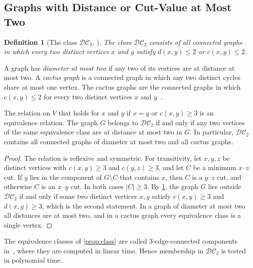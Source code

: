 \documentclass[pdflatex,sn-mathphys-num]{sn-jnl}%
\theoremstyle{thmstyleone}%
\theoremstyle{thmstyletwo}%
\theoremstyle{thmstylethree}%
\newtheorem{definition}{Definition}%
\newcommand{\DC}{\mathcal{DC}_2}%
\begin{document}
\subsection{Graphs with Distance or Cut-Value at Most Two}
\label{sec:class}

\begin{definition}[The class $\DC$, {\cite[Definition~37]{Michel2025MinCutPath}}]
\label{def:class}
The class $\DC$ consists of all connected graphs in which every two distinct vertices $x$ and $y$ satisfy $d(x, y) \leq 2$ or $c(x, y) \leq 2$.
\end{definition}

A graph has \emph{diameter at most two} if any two of its vertices are at distance at most two.
A \emph{cactus graph} is a connected graph in which any two distinct cycles share at most one vertex.
The cactus graphs are the connected graphs in which $c(x, y) \leq 2$ for every two distinct vertices $x$ and $y$~\cite[Lemma~6.1]{Michel2026MinCutPath}.

\begin{proposition}
\label{prop:class}
The relation on $V$ that holds for $x$ and $y$ if $x = y$ or $c(x, y) \geq 3$ is an equivalence relation.
The graph $G$ belongs to $\DC$ if and only if any two vertices of the same equivalence class are at distance at most two in $G$.
In particular, $\DC$ contains all connected graphs of diameter at most two and all cactus graphs.
\end{proposition}

\begin{proof}
The relation is reflexive and symmetric.
For transitivity, let $x, y, z$ be distinct vertices with $c(x, y) \geq 3$ and $c(y, z) \geq 3$, and let $C$ be a minimum $x$--$z$ cut.
If $y$ lies in the component of $G \setminus C$ that contains $x$, then $C$ is a $y$--$z$ cut, and otherwise $C$ is an $x$--$y$ cut.
In both cases $|C| \geq 3$.
By \cref{def:class}, the graph $G$ lies outside $\DC$ if and only if some two distinct vertices $x, y$ satisfy $c(x, y) \geq 3$ and $d(x, y) \geq 3$, which is the second statement.
In a graph of diameter at most two all distances are at most two, and in a cactus graph every equivalence class is a single vertex.
\end{proof}

The equivalence classes of \cref{prop:class} are called 3-edge-connected components in~\cite{Mehlhorn2017Certifying}, where they are computed in linear time.
Hence membership in $\DC$ is tested in polynomial time.
\end{document}
